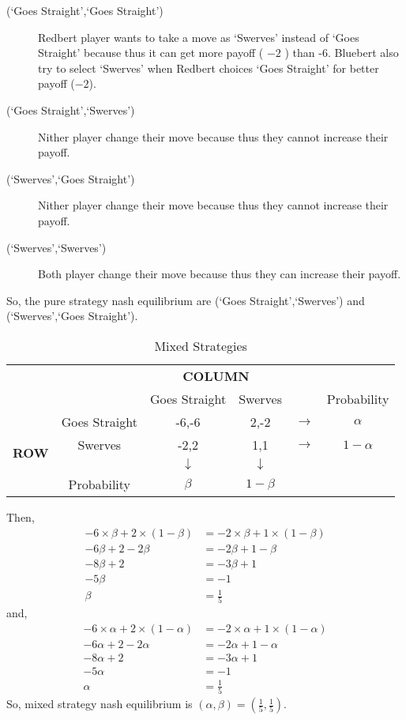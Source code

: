 \documentclass[a4paper,12pt]{article}
\begin{document}
\begin{enumerate}
\begin{enumerate}
\begin{description}
 \item [(`Goes Straight',`Goes Straight')] Redbert player wants to take a move as `Swerves' instead of `Goes Straight' because thus it can get more payoff ( $-2$ ) than -6. Bluebert also try to select `Swerves' when Redbert choices `Goes Straight' for better payoff ($-2$).
 
 \item [(`Goes Straight',`Swerves')] Nither player change their move because thus they cannot increase their payoff.

 \item [(`Swerves',`Goes Straight')] Nither player change their move because thus they cannot increase their payoff.
 \item [(`Swerves',`Swerves')] Both player change their move because thus they can increase their payoff.
 \end{description}
 So, the pure strategy nash equilibrium are (`Goes Straight',`Swerves') and (`Swerves',`Goes Straight').

 \begin{table}[H]
 \centering
\begin{tabular}{@{}cccccc@{}}
\toprule
\multicolumn{2}{c}{} & \multicolumn{2}{c}{\bfseries COLUMN}\\
\multicolumn{2}{c}{} & Goes Straight & Swerves & & Probability\\
\multirow{4}{*}{\bfseries ROW} & Goes Straight & -6,-6 & 2,-2 & $\rightarrow$ & $\alpha$\\
 & Swerves & -2,2 & 1,1 & $\rightarrow$ & $1-\alpha$\\
 & & $\downarrow$ & $\downarrow$ & \\
 & Probability & $\beta$ & $1-\beta$ &\\
 \bottomrule
\end{tabular}
\caption{Mixed Strategies}
\end{table}

Then,
\begin{align*}
-6\times\beta + 2\times(1-\beta)  & = -2\times \beta + 1\times(1-\beta)\\
-6\beta +2-2\beta &=-2\beta +1-\beta\\
-8\beta+2 &=-3\beta+1\\
-5\beta &=-1\\
\beta &=\frac{1}{5}
\end{align*}
and,
\begin{align*}
-6\times\alpha+2\times(1-\alpha) &=-2\times \alpha+1\times(1-\alpha)\\
-6\alpha+2-2\alpha &=-2\alpha+1-\alpha\\
-8\alpha+2 &=-3\alpha+1\\
-5\alpha &=-1\\
\alpha&=\frac{1}{5}
\end{align*}
So, mixed strategy nash equilibrium is $(\alpha,\beta)=(\frac{1}{5},\frac{1}{5})$.
\end{enumerate}


\end{enumerate}
\end{document}
